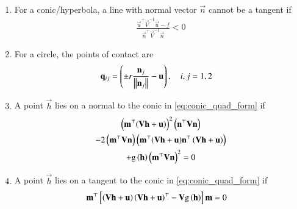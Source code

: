 \begin{enumerate}[label=\thesubsection.\arabic*,ref=\thesubsection.\theenumi]
\item For a conic/hyperbola, a line with normal vector $\vec{n}$ cannot be a tangent if 
	\label{prop:conic-p-contact-nonparab-cond}
\begin{align}
\frac{
\vec{u}^{\top}\vec{V}^{-1}\vec{u}-f
}
{
\vec{n}^{\top}\vec{V}^{-1}\vec{n}
} < 0
	\label{eq:conic-p-contact-nonparab-cond}
\end{align}
\item For a circle, the points of contact are
	\begin{align}
	\mathbf{q}_{ij} &= \left(\pm r \frac{\mathbf{n}_j}{\left\lVert\mathbf{n}_j\right\rVert}-\mathbf{u}\right), \quad i,j = 1,2
\label{eq:conic_tangent_qk-circ}
\end{align}
\item A point $\vec{h}$ lies on a normal to the conic in \eqref{eq:conic_quad_form} 
	if
\begin{multline}
	\label{eq:point_of_tangency-m}
	\left( {\mathbf{m}^\top(\mathbf{Vh}+\mathbf{u})}\right)^2\left(\mathbf{n}^{\top}\mathbf{V}\mathbf{n}\right) 
	\\
	- 2\left(\mathbf{m}^\top\mathbf{V}\mathbf{n}\right) \left( {\mathbf{m}^\top(\mathbf{Vh}+\mathbf{u})}\mathbf{n}^{\top}\left(\mathbf{V}\mathbf{h}+\mathbf{u}\right)\right) 
	\\
+  \text{g}\left(
  \mathbf{h}
	  \right)\left(\mathbf{m}^\top\mathbf{V}\mathbf{n}\right)^2
	= 0
\end{multline}
\item  A point $\vec{h}$ lies on a tangent to the conic in \eqref{eq:conic_quad_form} if 
\begin{align}
  \mathbf{m}^{\top}  {}\left[\left(\mathbf{V}\mathbf{h}+\mathbf{u}\right)
	  \left(\mathbf{V}\mathbf{h}+\mathbf{u}\right)^{\top}
   -\mathbf{V}
	  \text{g}\left(
  \mathbf{h}
	  \right)
	  \right]\mathbf{m} 
	  &= 0                                                                                             
	  \label{eq:h-tangents-cond}
\end{align}
\end{enumerate}
